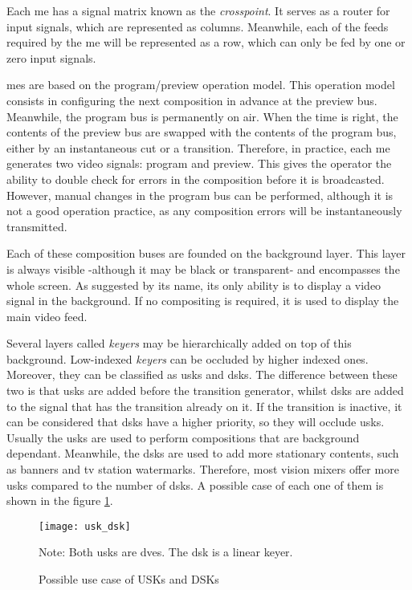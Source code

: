 \documentclass[../main.tex]{subfiles}
\begin{document}
Each \gls{me} has a signal matrix known as the \textit{crosspoint}. It serves as a router for input signals, which are represented as columns. Meanwhile, each of the feeds required by the \gls{me} will be represented as a row, which can only be fed by one or zero input signals.\newline

\Glspl{me} are based on the program/preview operation model. This operation model consists in configuring the next composition in advance at the preview bus. Meanwhile, the program bus is permanently on air. When the time is right, the contents of the preview bus are swapped with the contents of the program bus, either by an instantaneous cut or a transition. Therefore, in practice, each \gls{me} generates two video signals: program and preview. This gives the operator the ability to double check for errors in the composition before it is broadcasted. However, manual changes in the program bus can be performed, although it is not a good operation practice, as any composition errors will be instantaneously transmitted.\newline

Each of these composition buses are founded on the background layer. This layer is always visible -although it may be black or transparent- and encompasses the whole screen. As suggested by its name, its only ability is to display a video signal in the background. If no compositing is required, it is used to display the main video feed.\newline

Several layers called \textit{keyers} may be hierarchically added on top of this background. Low-indexed \textit{keyers} can be occluded by higher indexed ones. Moreover, they can be classified as \glspl{usk} and \glspl{dsk}. The difference between these two is that \glspl{usk} are added before the transition generator, whilst \glspl{dsk} are added to the signal that has the transition already on it. If the transition is inactive, it can be considered that \glspl{dsk} have a higher priority, so they will occlude \glspl{usk}. Usually the \glspl{usk} are used to perform compositions that are background dependant. Meanwhile, the \glspl{dsk} are used to add more stationary contents, such as banners and \gls{tv} station watermarks. Therefore, most vision mixers offer more \glspl{usk} compared to the number of \glspl{dsk}. A possible case of each one of them is shown in the figure \ref{fig:02:usk_dsk_example}.

\begin{figure}[htbp]
    \centering
    \texttt{[image: usk\_dsk]}

    Note: Both \glspl{usk} are \glspl{dve}. The \gls{dsk} is a linear keyer.
    \caption{Possible use case of USKs and DSKs}
    \label{fig:02:usk_dsk_example}
\end{figure}
\end{document}
